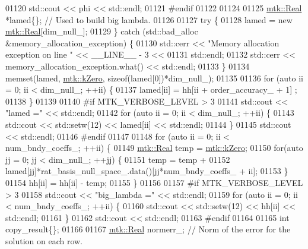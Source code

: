 \begin{DoxyCode}
{{01120     std::cout << phi << std::endl;
01121 \textcolor{preprocessor}{    #endif}
01122 
01124 
01125     \hyperlink{group__c01-roots_gac080bbbf5cbb5502c9f00405f894857d}{mtk::Real} *lamed\{\};  \textcolor{comment}{// Used to build big lambda.}
01126 
01127     \textcolor{keywordflow}{try} \{
01128       lamed = \textcolor{keyword}{new} \hyperlink{group__c01-roots_gac080bbbf5cbb5502c9f00405f894857d}{mtk::Real}[dim\_null\_];
01129     \} \textcolor{keywordflow}{catch} (std::bad\_alloc &memory\_allocation\_exception) \{
01130       std::cerr << \textcolor{stringliteral}{"Memory allocation exception on line "} << \_\_LINE\_\_ - 3 <<
01131         std::endl;
01132       std::cerr << memory\_allocation\_exception.what() << std::endl;
01133     \}
01134     memset(lamed, \hyperlink{group__c01-roots_ga59a451a5fae30d59649bcda274fea271}{mtk::kZero}, \textcolor{keyword}{sizeof}(lamed[0])*dim\_null\_);
01135 
01136     \textcolor{keywordflow}{for} (\textcolor{keyword}{auto} ii = 0; ii < dim\_null\_; ++ii) \{
01137       lamed[ii] = hh[ii + order\_accuracy\_ + 1] ;
01138     \}
01139 
01140 \textcolor{preprocessor}{    #if MTK\_VERBOSE\_LEVEL > 3}
01141     std::cout << \textcolor{stringliteral}{"lamed ="} << std::endl;
01142     \textcolor{keywordflow}{for} (\textcolor{keyword}{auto} ii = 0; ii < dim\_null\_; ++ii) \{
01143       std::cout << std::setw(12) << lamed[ii] << std::endl;
01144     \}
01145     std::cout << std::endl;
01146 \textcolor{preprocessor}{    #endif}
01147 
01148     \textcolor{keywordflow}{for} (\textcolor{keyword}{auto} ii = 0; ii < num\_bndy\_coeffs\_; ++ii) \{
01149       \hyperlink{group__c01-roots_gac080bbbf5cbb5502c9f00405f894857d}{mtk::Real} temp = \hyperlink{group__c01-roots_ga59a451a5fae30d59649bcda274fea271}{mtk::kZero};
01150       \textcolor{keywordflow}{for}(\textcolor{keyword}{auto} jj = 0; jj < dim\_null\_; ++jj) \{
01151         temp = temp +
01152           lamed[jj]*rat\_basis\_null\_space\_.data()[jj*num\_bndy\_coeffs\_ + ii];
01153       \}
01154       hh[ii] = hh[ii] - temp;
01155     \}
01156 
01157 \textcolor{preprocessor}{    #if MTK\_VERBOSE\_LEVEL > 3}
01158     std::cout << \textcolor{stringliteral}{"big\_lambda ="} << std::endl;
01159     \textcolor{keywordflow}{for} (\textcolor{keyword}{auto} ii = 0; ii < num\_bndy\_coeffs\_; ++ii) \{
01160       std::cout << std::setw(12) << hh[ii] << std::endl;
01161     \}
01162     std::cout << std::endl;
01163 \textcolor{preprocessor}{    #endif}
01164 
01165     \textcolor{keywordtype}{int} copy\_result\{\};
01166 
01167     \hyperlink{group__c01-roots_gac080bbbf5cbb5502c9f00405f894857d}{mtk::Real} normerr\_; \textcolor{comment}{// Norm of the error for the solution on each row.}
}}
\end{DoxyCode}
